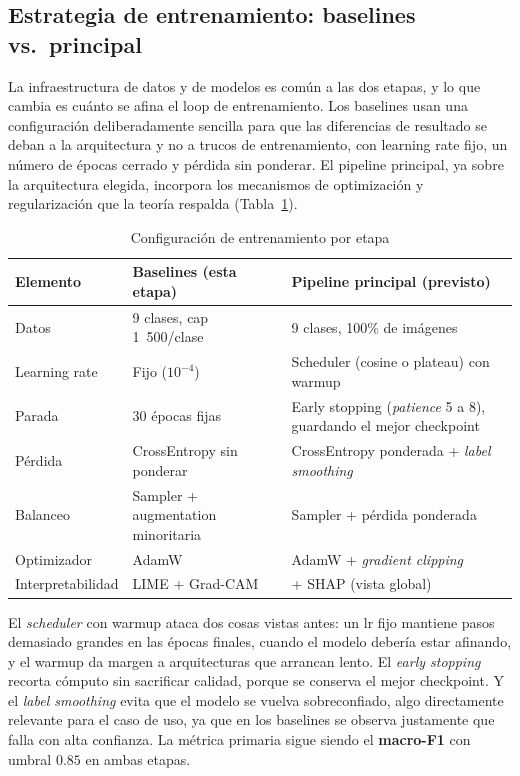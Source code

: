 \documentclass[12pt,letterpaper]{article}
\begin{document}
\subsection{Estrategia de entrenamiento: baselines vs.\ principal}
\label{sec:estrategia}

La infraestructura de datos y de modelos es com\'un a las dos etapas, y lo que cambia es cu\'anto se afina el loop de entrenamiento. Los baselines usan una configuraci\'on deliberadamente sencilla para que las diferencias de resultado se deban a la arquitectura y no a trucos de entrenamiento, con learning rate fijo, un n\'umero de \'epocas cerrado y p\'erdida sin ponderar. El pipeline principal, ya sobre la arquitectura elegida, incorpora los mecanismos de optimizaci\'on y regularizaci\'on que la teor\'ia respalda (Tabla~\ref{tab:estrategia}).

\begin{table}[H]
\caption{Configuraci\'on de entrenamiento por etapa}
\label{tab:estrategia}
\centering
\small
\begin{singlespace}
\begin{tabular}{p{3.0cm}p{4.0cm}p{4.5cm}}
\toprule
\textbf{Elemento} & \textbf{Baselines (esta etapa)} & \textbf{Pipeline principal (previsto)} \\
\midrule
Datos & 9 clases, cap 1~500/clase & 9 clases, 100\% de im\'agenes \\
Learning rate & Fijo ($10^{-4}$) & Scheduler (cosine o plateau) con warmup \\
Parada & 30 \'epocas fijas & Early stopping (\textit{patience} 5 a 8), guardando el mejor checkpoint \\
P\'erdida & CrossEntropy sin ponderar & CrossEntropy ponderada + \textit{label smoothing} \\
Balanceo & Sampler + augmentation minoritaria & Sampler + p\'erdida ponderada \\
Optimizador & AdamW & AdamW + \textit{gradient clipping} \\
Interpretabilidad & LIME + Grad-CAM & + SHAP (vista global) \\
\bottomrule
\end{tabular}
\end{singlespace}
\end{table}

El \textit{scheduler} con warmup ataca dos cosas vistas antes: un lr fijo mantiene pasos demasiado grandes en las \'epocas finales, cuando el modelo deber\'ia estar afinando, y el warmup da margen a arquitecturas que arrancan lento. El \textit{early stopping} recorta c\'omputo sin sacrificar calidad, porque se conserva el mejor checkpoint. Y el \textit{label smoothing} evita que el modelo se vuelva sobreconfiado, algo directamente relevante para el caso de uso, ya que en los baselines se observa justamente que falla con alta confianza. La m\'etrica primaria sigue siendo el \textbf{macro-F1} con umbral $0.85$ en ambas etapas.
\end{document}
